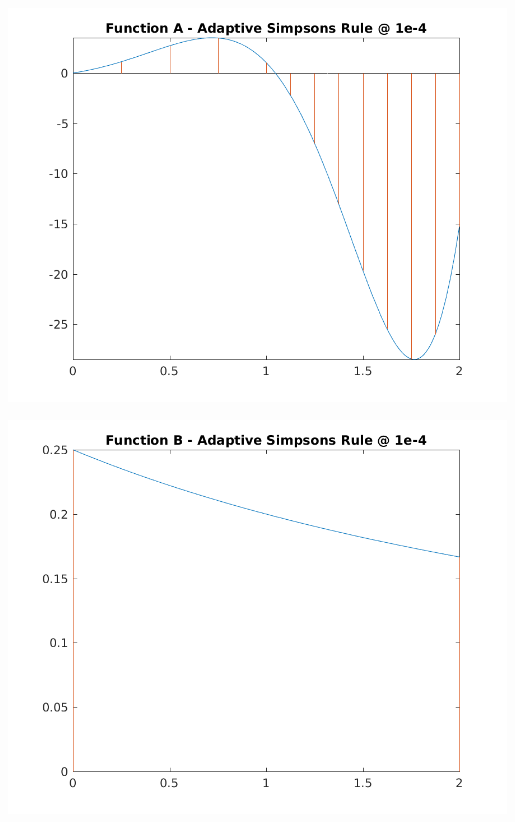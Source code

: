 \documentclass[a4paper]{article}
\begin{document}
\begin{center}
    \centering
    \begin{minipage}{0.5\textwidth}
        \centering
        \includegraphics[width=0.99\textwidth]{../output/a_adaptive_simpsons_4.png}
    \end{minipage}\hfill
    \begin{minipage}{0.5\textwidth}
        \centering
        \includegraphics[width=0.99\textwidth]{../output/b_adaptive_simpsons_4.png}
    \end{minipage}
	\label{fig:adap4}
\end{center}
\end{document}

